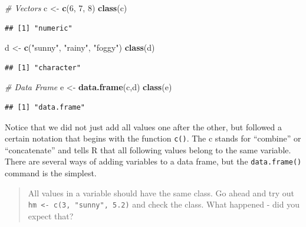 \documentclass[
]{book}
\newenvironment{Shaded}{\begin{snugshade}}{\end{snugshade}}
\newcommand{\CommentTok}[1]{\textcolor[rgb]{0.56,0.35,0.01}{\textit{#1}}}
\newcommand{\DecValTok}[1]{\textcolor[rgb]{0.00,0.00,0.81}{#1}}
\newcommand{\FunctionTok}[1]{\textcolor[rgb]{0.13,0.29,0.53}{\textbf{#1}}}
\newcommand{\NormalTok}[1]{#1}
\newcommand{\OtherTok}[1]{\textcolor[rgb]{0.56,0.35,0.01}{#1}}
\newcommand{\StringTok}[1]{\textcolor[rgb]{0.31,0.60,0.02}{#1}}
\begin{document}
\begin{Shaded}
\begin{Highlighting}[]
\CommentTok{\# Vectors}
\NormalTok{c }\OtherTok{\textless{}{-}} \FunctionTok{c}\NormalTok{(}\DecValTok{6}\NormalTok{, }\DecValTok{7}\NormalTok{, }\DecValTok{8}\NormalTok{)}
\FunctionTok{class}\NormalTok{(c)}
\end{Highlighting}
\end{Shaded}

\begin{verbatim}
## [1] "numeric"
\end{verbatim}

\begin{Shaded}
\begin{Highlighting}[]
\NormalTok{d }\OtherTok{\textless{}{-}} \FunctionTok{c}\NormalTok{(}\StringTok{"sunny"}\NormalTok{, }\StringTok{"rainy"}\NormalTok{, }\StringTok{"foggy"}\NormalTok{)}
\FunctionTok{class}\NormalTok{(d)}
\end{Highlighting}
\end{Shaded}

\begin{verbatim}
## [1] "character"
\end{verbatim}

\begin{Shaded}
\begin{Highlighting}[]
\CommentTok{\# Data Frame}
\NormalTok{e }\OtherTok{\textless{}{-}} \FunctionTok{data.frame}\NormalTok{(c,d)}
\FunctionTok{class}\NormalTok{(e)}
\end{Highlighting}
\end{Shaded}

\begin{verbatim}
## [1] "data.frame"
\end{verbatim}

Notice that we did not just add all values one after the other, but followed a certain notation that begins with the function \texttt{c()}.
The c stands for ``combine'' or ``concatenate'' and tells R that all following values belong to the same variable.
There are several ways of adding variables to a data frame, but the \texttt{data.frame()} command is the simplest.

\begin{quote}
All values in a variable should have the same class.
Go ahead and try out \texttt{hm\ \textless{}-\ c(3,\ "sunny",\ 5.2)} and check the class.
What happened - did you expect that?
\end{quote}
\end{document}
